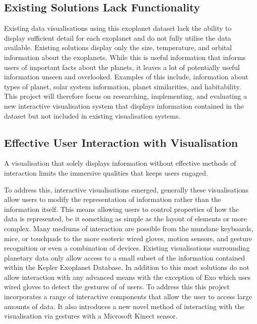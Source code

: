 \subsection{Existing Solutions Lack Functionality}
Existing data visualisations using this exoplanet dataset lack the
ability to display sufficient detail for each exoplanet and do not fully utilise
the data available. Existing solutions display only the size, temperature,
and orbital information about the exoplanets. While this is useful information
that informs users of important facts about the planets, it leaves a lot of
potentially useful information unseen and overlooked. 
Examples of this include, information about types of planet, solar system
information,
planet similarities, and habitability. This project will therefore focus on
researching, implementing, and evaluating a new interactive visualisation system
that displays information contained in the dataset but not
included in existing visualisation systems.

\subsection{Effective User Interaction with Visualisation}
A visualisation that solely displays information without effective methods of
interaction limits the immersive qualities that keeps users engaged.

To address
this, interactive visualisations emerged, generally these visualisations allow
users to modify the representation of information rather than the information
itself. This means allowing users to control properties of how the data is
represented, be it something as simple as the layout of elements or
more complex. Many mediums of interaction are possible from the mundane
keyboards, mice, or touchpads to the more esoteric wired gloves, motion sensors,
and gesture recognition or even a combination of devices. Existing
visualisations surrounding planetary data only allow access to a small subset of
the information contained within the Kepler Exoplanet Database. In addition to
this most solutions do not allow interaction with any advanced means with the
exception of Exo \cite{exo} which uses wired gloves to detect the gestures of of
users. To address this this project incorporates a range of interactive
components that allow the user to access large amounts of data. It also
introduces a new novel method of interacting with the visualisation via gestures
with a Microsoft Kinect sensor.

